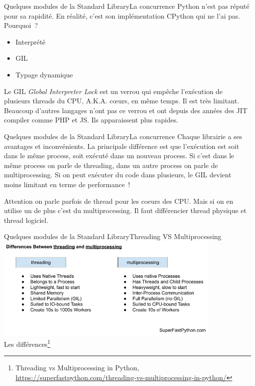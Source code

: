\documentclass{beamer}
\begin{document}
    \begin{frame}{Quelques modules de la Standard Library}{La concurrence}
        Python n'est pas réputé pour sa rapidité.
        En réalité, c'est son implémentation CPython qui ne l'ai pas.
        \bigbreak
        Pourquoi~?
        \pause
        \begin{itemize}
            \item Interprété
            \item GIL
            \item Typage dynamique
        \end{itemize}
        Le GIL \textit{Global Interpreter Lock} est un verrou qui empêche l'exécution de plusieurs threads du CPU, A.K.A. cœurs, en même temps.
        Il est très limitant.
        Beaucoup d'autres langages n'ont pas ce verrou et ont depuis des années des JIT compiler comme PHP et JS.
        Ils apparaissent plus rapides.
    \end{frame}

    \begin{frame}{Quelques modules de la Standard Library}{La concurrence}
        Chaque librairie a ses avantages et inconvénients.
        La principale différence est que l'exécution est soit dans le même process, soit exécuté dans un nouveau process.
        \bigbreak
        Si c'est dans le même process on parle de threading, dans un autre process on parle de multiprocessing.
        \bigbreak
        Si on peut exécuter du code dans plusieurs, le GIL devient moins limitant en terme de performance~!
        \begin{dangercolorbox}
            Attention on parle parfois de thread pour les coeurs des CPU. Mais si on en utilise un de plus c'est du multiprocessing.
            Il faut différencier thread physique et thread logiciel.
        \end{dangercolorbox}
    \end{frame}

    \begin{frame}{Quelques modules de la Standard Library}{Threading VS Multiprocessing}
        \centering
        \includegraphics[width=11cm]{image/threading-vs-multiprocessing} \\ Les différences\footnote{Threading vs Multiprocessing in Python, \url{https://superfastpython.com/threading-vs-multiprocessing-in-python/}} \\
    \end{frame}
\end{document}

